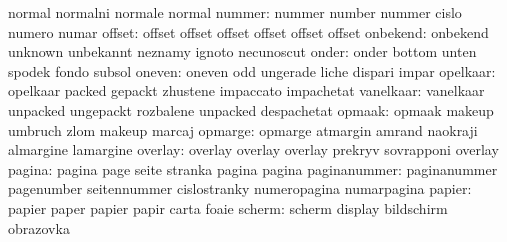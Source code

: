                            normal                    normalni
                           normale                   normal
                   nummer: nummer                    number
                           nummer                    cislo
                           numero                    numar
                   offset: offset                    offset
                           offset                    offset
                           offset                    offset
                 onbekend: onbekend                  unknown
                           unbekannt                 neznamy
                           ignoto                    necunoscut
                    onder: onder                     bottom
                           unten                     spodek
                           fondo                     subsol
                   oneven: oneven                    odd
                           ungerade                  liche
                           dispari                   impar
                 opelkaar: opelkaar                  packed
                           gepackt                   zhustene
                           impaccato                 impachetat
                vanelkaar: vanelkaar                 unpacked
                           ungepackt                 rozbalene
                           unpacked                  despachetat
                   opmaak: opmaak                    makeup
                           umbruch                   zlom
                           makeup                    marcaj
                  opmarge: opmarge                   atmargin
                           amrand                    naokraji
                           almargine                 lamargine
                  overlay: overlay                   overlay
                           overlay                   prekryv
                           sovrapponi                overlay
                   pagina: pagina                    page
                           seite                     stranka
                           pagina                    pagina
             paginanummer: paginanummer              pagenumber
                           seitennummer              cislostranky
                           numeropagina              numarpagina
                   papier: papier                    paper
                           papier                    papir
                           carta                     foaie
                   scherm: scherm                    display
                           bildschirm                obrazovka
